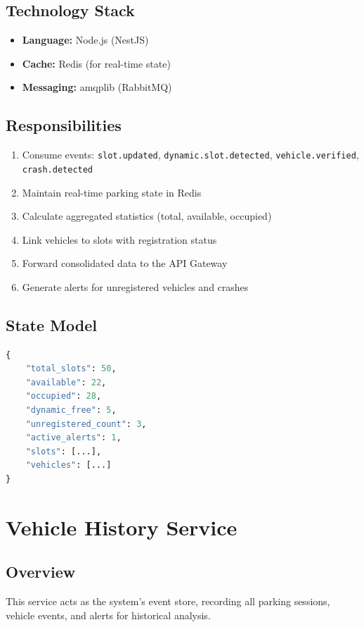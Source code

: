 \documentclass[12pt,a4paper]{report}
\begin{document}
\subsection{Technology Stack}
\begin{itemize}
    \item \textbf{Language:} Node.js (NestJS)
    \item \textbf{Cache:} Redis (for real-time state)
    \item \textbf{Messaging:} amqplib (RabbitMQ)
\end{itemize}

\subsection{Responsibilities}
\begin{enumerate}
    \item Consume events: \texttt{slot.updated}, \texttt{dynamic.slot.detected}, \texttt{vehicle.verified}, \texttt{crash.detected}
    \item Maintain real-time parking state in Redis
    \item Calculate aggregated statistics (total, available, occupied)
    \item Link vehicles to slots with registration status
    \item Forward consolidated data to the API Gateway
    \item Generate alerts for unregistered vehicles and crashes
\end{enumerate}

\subsection{State Model}
\begin{lstlisting}[language=Python, caption=Aggregated Parking State]
{
    "total_slots": 50,
    "available": 22,
    "occupied": 28,
    "dynamic_free": 5,
    "unregistered_count": 3,
    "active_alerts": 1,
    "slots": [...],
    "vehicles": [...]
}
\end{lstlisting}


\section{Vehicle History Service}

\subsection{Overview}
This service acts as the system's event store, recording all parking sessions, vehicle events, and alerts for historical analysis.
\end{document}
